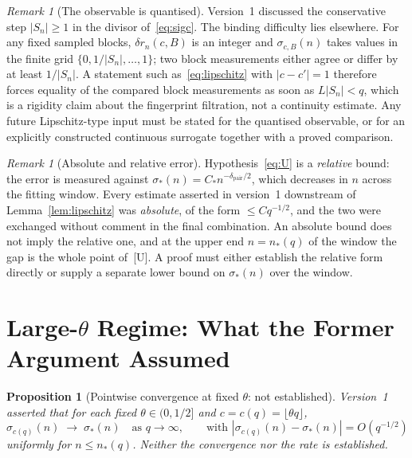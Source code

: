 \documentclass[12pt,a4paper]{article}
\newtheorem{proposition}[theorem]{Proposition}
\theoremstyle{definition}
\theoremstyle{remark}
\newtheorem{remark}[theorem]{Remark}
\newcommand{\dpair}{\delta_{\mathrm{pair}}}
\begin{document}
    \begin{remark}[The observable is quantised]\label{rem:uniform-n}
      Version~1 discussed the conservative step $|S_n| \geq 1$ in the divisor
      of~\eqref{eq:sigc}.
      The binding difficulty lies elsewhere.
      For any fixed sampled blocks, $\delta r_n(c,B)$ is an integer and
      $\sigma_{c,B}(n)$ takes values in the finite grid
      $\{0, 1/|S_n|, \dots, 1\}$; two block measurements either agree or differ by at
      least $1/|S_n|$.
      A statement such as~\eqref{eq:lipschitz} with $|c-c'| = 1$ therefore forces
      equality of the compared block measurements as soon as $L|S_n| < q$, which is a rigidity
      claim about the fingerprint filtration, not a continuity estimate.
      Any future Lipschitz-type input must be stated for the quantised observable, or for an
      explicitly constructed continuous surrogate together with a proved comparison.
    \end{remark}

    \begin{remark}[Absolute and relative error]\label{rem:absolute-relative}
      Hypothesis~\eqref{eq:U} is a \emph{relative} bound: the error is measured against
      $\sigma_*(n) = C_*n^{-\dpair/2}$, which decreases in $n$ across the fitting window.
      Every estimate asserted in version~1 downstream of Lemma~\ref{lem:lipschitz} was
      \emph{absolute}, of the form $\leq Cq^{-1/2}$, and the two were exchanged without
      comment in the final combination.
      An absolute bound does not imply the relative one, and at the upper end $n = n_*(q)$ of
      the window the gap is the whole point of~[U].
      A proof must either establish the relative form directly or supply a separate lower
      bound on $\sigma_*(n)$ over the window.
    \end{remark}

  \section{Large-$\theta$ Regime: What the Former Argument Assumed}\label{sec:largetheta}

    \begin{proposition}[Pointwise convergence at fixed $\theta$: not established]\label{prop:pointwise}
      Version~1 asserted that for each fixed $\theta \in (0,1/2]$ and
      $c = c(q) = \lfloor\theta q\rfloor$,
      \begin{equation}\label{eq:pointwise}
        \sigma_{c(q)}(n) \;\to\; \sigma_*(n) \quad \text{as } q \to \infty,
        \qquad \text{with } |\sigma_{c(q)}(n) - \sigma_*(n)| = O(q^{-1/2})
      \end{equation}
      uniformly for $n \leq n_*(q)$.
      Neither the convergence nor the rate is established.
    \end{proposition}
\end{document}
